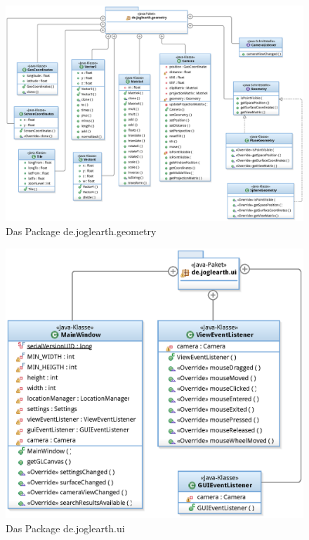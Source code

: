 \documentclass[10pt]{scrreprt}
\begin{document}
\begin{figure}[!htb]
\begin{center}
	\includegraphics[scale=0.55]{de_joglearth_geometry.eps}
\end{center}
\caption{Das Package de.joglearth.geometry}
\end{figure}

\begin{figure}[!htb]
\begin{center}
	\includegraphics[scale=0.55]{de_joglearth_ui.eps}
\end{center}
\caption{Das Package de.joglearth.ui}
\end{figure}
\end{document}
